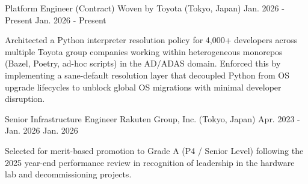

\begin{cventries}

    \cventry
    {Platform Engineer (Contract)} %
    {Woven by Toyota (Tokyo, Japan)} %
    {Jan. 2026 - Present} %
    {Jan. 2026 - Present} %
    { 
      \begin{cvitems}
        \item {Architected a Python interpreter resolution policy for 4,000+ developers across multiple Toyota group companies working within heterogeneous monorepos (Bazel, Poetry, ad-hoc scripts) in the AD/ADAS domain. Enforced this by implementing a sane-default resolution layer that decoupled Python from OS upgrade lifecycles to unblock global OS migrations with minimal developer disruption.}
      \end{cvitems}
    }

  \cventry
    {Senior Infrastructure Engineer} %
    {Rakuten Group, Inc. (Tokyo, Japan)} %
    {Apr. 2023 - Jan. 2026} %
    {Jan. 2026} %
    {
      \begin{cvitems}
        \item {Selected for merit-based promotion to Grade A (P4 / Senior Level) following the 2025 year-end performance review in recognition of leadership in the hardware lab and decommissioning projects.}
      \end{cvitems}
    }
  

\end{cventries}
